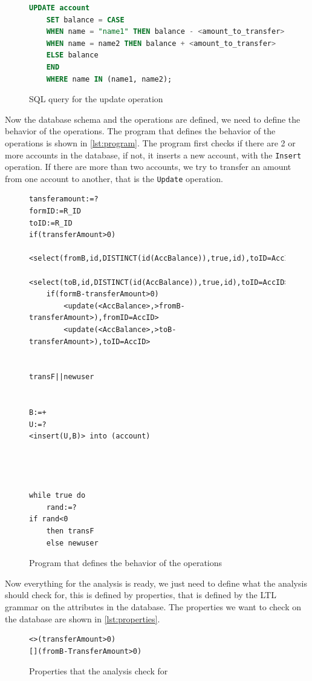 \begin{figure}[htb!]
\begin{lstlisting}[language=SQL]
    UPDATE account
    SET balance = CASE
    WHEN name = "name1" THEN balance - <amount_to_transfer>
    WHEN name = name2 THEN balance + <amount_to_transfer>
    ELSE balance
    END
    WHERE name IN (name1, name2);
\end{lstlisting}
\label{lst:sql-queries2}
\caption{SQL query for the update operation}
\end{figure}

Now the database schema and the operations are defined, we need to define the behavior of the operations.
The program that defines the behavior of the operations is shown in \autoref{lst:program}.
The program first checks if there are 2 or more accounts in the database, if not, it inserts a new account, with the \texttt{Insert} operation.
If there are more than two accounts, we try to transfer an amount from one account to another, that is the \texttt{Update} operation.

\begin{figure}[htb!]
\begin{lstlisting}
tansferamount:=?
formID:=R_ID
toID:=R_ID
if(transferAmount>0)
    <select(fromB,id,DISTINCT(id(AccBalance)),true,id),toID=AccID>
    <select(toB,id,DISTINCT(id(AccBalance)),true,id),toID=AccID>
    if(formB-transferAmount>0)
        <update(<AccBalance>,>fromB-transferAmount>),fromID=AccID>
        <update(<AccBalance>,>toB-transferAmount>),toID=AccID>


transF||newuser


B:=+
U:=?
<insert(U,B)> into (account)




while true do
    rand:=?
if rand<0
    then transF
    else newuser
\end{lstlisting}
\label{lst:program}
\caption{Program that defines the behavior of the operations}
\end{figure}

Now everything for the analysis is ready, we just need to define what the analysis should check for, this is defined by properties, that is defined by the LTL grammar on the attributes in the database.
The properties we want to check on the database are shown in \autoref{lst:properties}.
\begin{figure}[htb!]
\begin{lstlisting}
<>(transferAmount>0)
[](fromB-TransferAmount>0)
    \end{lstlisting}
\label{lst:properties}
\caption{Properties that the analysis check for}
\end{figure}

